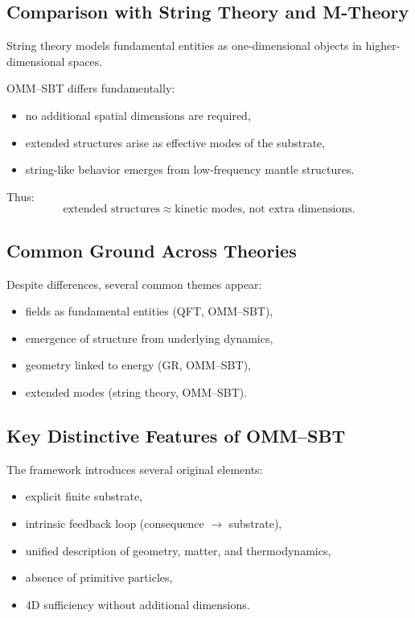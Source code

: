 \documentclass[11pt]{article}
\begin{document}
\subsection{Comparison with String Theory and M-Theory}

String theory models fundamental entities as one-dimensional objects in higher-dimensional spaces.

OMM--SBT differs fundamentally:
\begin{itemize}
\item no additional spatial dimensions are required,
\item extended structures arise as effective modes of the substrate,
\item string-like behavior emerges from low-frequency mantle structures.
\end{itemize}

Thus:
\begin{equation}
\text{extended structures} \approx \text{kinetic modes, not extra dimensions}.
\end{equation}

\subsection{Common Ground Across Theories}

Despite differences, several common themes appear:

\begin{itemize}
\item fields as fundamental entities (QFT, OMM--SBT),
\item emergence of structure from underlying dynamics,
\item geometry linked to energy (GR, OMM--SBT),
\item extended modes (string theory, OMM--SBT).
\end{itemize}

\subsection{Key Distinctive Features of OMM--SBT}

The framework introduces several original elements:

\begin{itemize}
\item explicit finite substrate,
\item intrinsic feedback loop (consequence $\rightarrow$ substrate),
\item unified description of geometry, matter, and thermodynamics,
\item absence of primitive particles,
\item 4D sufficiency without additional dimensions.
\end{itemize}
\end{document}
